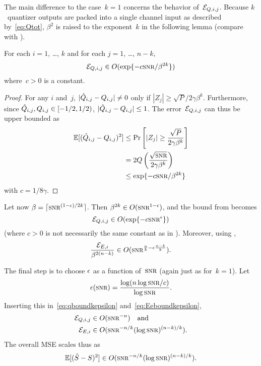 The main difference to the case~$k=1$ concerns the behavior of~${\mathcal{E}}_{Q,i,j}$.
Because $k$~quantizer outputs are packed into a single channel input as
described by~\eqref{eq:Qtot}, $\beta^2$ is raised to the exponent~$k$ in the
following lemma (compare with ).

\begin{lemma}
  \label{lem:eqboundk}
  For each $i = 1$, \dots, $k$ and for each $j = 1$, \dots, $n-k$,
  \begin{equation*}
    \Err_{Q,i,j} \in O(\exp\{-c \snr/\beta^{2k} \})
  \end{equation*}
  where~$c > 0$ is a constant.
\end{lemma}

\begin{proof}
  For any $i$ and~$j$, $| \hat{Q}_{i,j} - Q_{i,j}| \ne 0$ only if $|Z_j| \ge
  \sqrt{P} / 2 \gamma \beta^k$. Furthermore, since $\hat{Q}_{i,j}, Q_{i,j} \in
  [-1/2, 1/2)$, $|\hat{Q}_{i,j} - Q_{i,j}| \le 1$. The error~${\mathcal{E}}_{Q,i,j}$ can thus
  be upper bounded as
  \begin{align*}
    \E[(\Qh_{i,j} - Q_{i,j})^2] &\le \Pr\left[|Z_j| \ge \frac{\sqrt{P}}{2 \gamma
    \beta^k} \right] \\
    &= 2 Q\left( \frac{\sqrt\snr}{2\gamma\beta^k} \right) \\
    &\le \exp\{-c \snr / \beta^{2k} \}
  \end{align*}
  with $c = 1/8\gamma$.
\end{proof}


Let now $\beta = \lceil \snr^{(1-\e)/2k} \rceil$. Then $\beta^{2k} \in
O(\snr^{1-\e})$, and the bound from  becomes
\begin{equation}
  \label{eq:qboundkepsilon}
  \Err_{Q,i,j} \in O(\exp\{-c \snr^\e\})
\end{equation}
(where $c > 0$ is not necessarily the same constant as in ).
Moreover, using ,
\begin{equation}
  \label{eq:Eeboundkepsilon}
  \frac{\Err_{E,i}}{\beta^{2(n-k)}} \in O(\snr^{\frac{n}{k} - \e
  \frac{n-k}{k}}).
\end{equation}

The final step is to choose $\epsilon$ as a function of~$\snr$ (again just as
for~$k=1$). Let
\begin{equation*}
  \e(\snr) = \frac{\log(n \log\snr / c)}{\log\snr}.
\end{equation*}
Inserting this in~\eqref{eq:qboundkepsilon} and~\eqref{eq:Eeboundkepsilon}, 
\begin{align*}
  \Err_{Q,i,j} &\in O(\snr^{-n}) \quad\text{and} \\
  \Err_{E,i} &\in O(\snr^{-n/k} (\log\snr)^{(n-k)/k}).
\end{align*}
The overall MSE scales thus as
\begin{equation*}
  \mse \in O(\snr^{-n/k} (\log\snr)^{(n-k)/k}).
\end{equation*}


